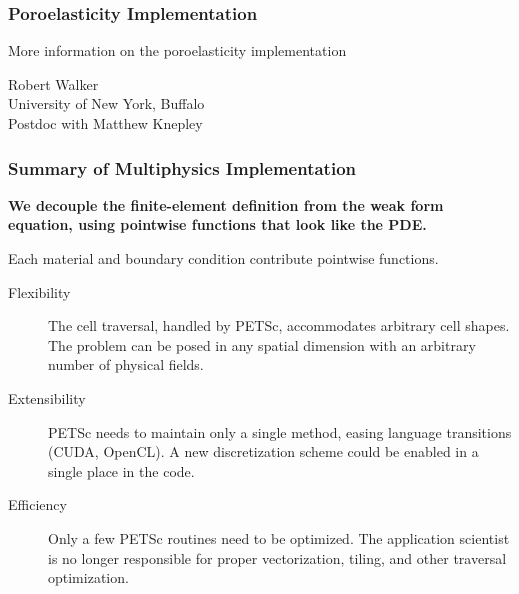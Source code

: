 \documentclass[aspectratio=169]{beamer}
\newcommand{\highlight}[1]{{\bf\color{green}#1}}
\begin{document}
\begin{frame}
  \frametitle{Poroelasticity Implementation}
  \summary{}

  \vfill
  More information on the poroelasticity implementation
  
  \vfill
  Robert Walker\\
  University of New York, Buffalo\\
  Postdoc with Matthew Knepley
  
\end{frame}


\begin{frame}
  \frametitle{Summary of Multiphysics Implementation}
  \summary{}

  \highlight{We decouple the finite-element definition from the weak
    form equation, using pointwise functions that look like the PDE.}

  \vfill
  Each material and boundary condition contribute pointwise functions.

  \vfill    
  \begin{description}
  \item[Flexibility] The cell traversal, handled by PETSc,
    accommodates arbitrary cell shapes. The problem can be posed in
    any spatial dimension with an arbitrary number of physical fields.
  \item[Extensibility] PETSc needs to maintain only a single method,
    easing language transitions (CUDA, OpenCL). A new discretization
    scheme could be enabled in a single place in the code.
  \item[Efficiency] Only a few PETSc routines need to be
    optimized. The application scientist is no longer responsible for
    proper vectorization, tiling, and other traversal optimization.
  \end{description}

\end{frame}
\end{document}
